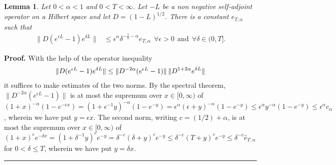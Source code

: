 \documentclass[12pt]{article}
\newtheorem{lemma}[theorem]{Lemma}
\newenvironment{proof}[1][Proof]{\textbf{#1.} }{\ \rule{0.5em}{0.5em}}
\numberwithin{equation}{section}
\begin{document}
 


\begin{lemma}\label{lemST8b} 
 Let $ 0 < \alpha < 1$ and $0 < T <\infty$. Let $-L$ be a non negative self-adjoint operator on a Hilbert space
 and let $D = (1-L)^{1/2}$.
 There is a constant $e_{T, \alpha}$ such that      
  \begin{align}
     \| D(e^{\epsilon L} -1) e^{\delta L} \|
 &\le \epsilon^\alpha \delta ^{-\frac{1}{2} - \alpha} e_{T,\alpha}    
      \ \    \forall \epsilon > 0\ \  \text{and}\ \ \forall \delta \in (0, T].            \label{vst118}   
           \end{align}
\end{lemma}
\begin{proof}With the help of the operator inequality
\begin{align}
\| D(e^{\epsilon L} -1) e^{\delta L} \| \le \|D^{-2\alpha}(e^{\epsilon L} -1)\|\, \| D^{1+2\alpha} e^{\delta L}\| \notag 
\end{align}
it suffices to make estimates of the two norms. By the spectral theorem, $\|D^{-2\alpha}(e^{\epsilon L} -1)\|$
is at most the supremum over $x \in [0, \infty)$ of 
$ (1+x)^{-\alpha} (1 - e^{-\epsilon x}) = (1 +\epsilon^{-1} y)^{-\alpha}(1 - e^{-y})
=\epsilon^{\alpha} (\epsilon + y)^{-\alpha} (1- e^{-y}) \le \epsilon^\alpha  y^{-\alpha} (1- e^{-y})
  \le \epsilon^{\alpha} c_\alpha$,  
  wherein we have put   $y = \epsilon x$. The second norm, writing $c = (1/2) +\alpha$, 
   is at most the supremum over $ x \in [0,\infty)$   of  
  $(1+x)^c e^{-\delta x} = (1+ \delta^{-1} y)^c e^{-y} 
   = \delta^{-c} (\delta + y)^c e^{-y}\le  \delta^{-c} (T + y)^c e^{-y}\le \delta^{-c}  \hat e_{T,\alpha}$
    for $0 < \delta \le T$,
    wherein we have put $y = \delta x$.
\end{proof}
     
\end{document}
